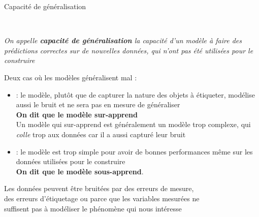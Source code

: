 \documentclass[10pt]{beamer}
\newcommand{\hsp}{\hspace*{1em}}
\begin{document}

\begin{frame}{Capacité de généralisation}
	
	\vspace*{-0.5em}
	\\
	\vspace*{-0.1em}
	\begin{vblock}{}\itshape
On appelle \textbf{capacité de généralisation} la capacité d’un modèle à faire des prédictions correctes sur de nouvelles données, qui n’ont pas été utilisées pour le construire
	\end{vblock}
	\vspace*{-0.1em}
Deux cas où les modèles généralisent mal :\\[0.8em]
\begin{itemize}
	\item {} : le modèle, plutôt que de capturer la nature des objets à étiqueter, modélise aussi le bruit et ne sera pas en mesure de généraliser\\ \textbf{On dit que le modèle sur-apprend} \\[0.5em]
	
	Un modèle qui sur-apprend est généralement un modèle trop complexe, qui \textit{colle} trop aux données car il a aussi capturé leur bruit\\[1em]
	\item {} : le modèle est trop simple pour avoir de bonnes performances même sur les données utilisées pour le construire\\ \textbf{On dit que le modèle sous-apprend}.
\end{itemize}

\vspace*{0.8em}
 \hsp Les données peuvent être bruitées par des erreurs de mesure,\\
\phantom{\bftitle{Remarque} \hsp}des erreurs d'étiquetage ou parce que les variables mesurées ne\\
\phantom{\bftitle{Remarque} \hsp}suffisent pas à modéliser le phénomène qui nous intéresse
\end{frame}

\end{document}
